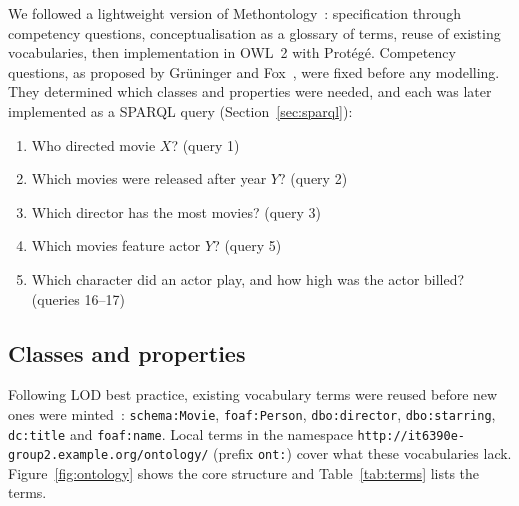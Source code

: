 \documentclass[11pt,a4paper]{article}
\newcommand{\code}[1]{\texttt{#1}}
\begin{document}
We followed a lightweight version of Methontology~\cite{methontology}: specification through competency questions, conceptualisation as a glossary of terms, reuse of existing vocabularies, then implementation in OWL~2 with Protégé. Competency questions, as proposed by Grüninger and Fox~\cite{gruninger1995}, were fixed before any modelling. They determined which classes and properties were needed, and each was later implemented as a SPARQL query (Section~\ref{sec:sparql}):
\begin{enumerate}
  \item Who directed movie $X$? \hfill (query 1)
  \item Which movies were released after year $Y$? \hfill (query 2)
  \item Which director has the most movies? \hfill (query 3)
  \item Which movies feature actor $Y$? \hfill (query 5)
  \item Which character did an actor play, and how high was the actor billed? \hfill (queries 16--17)
\end{enumerate}

\subsection{Classes and properties}

Following LOD best practice, existing vocabulary terms were reused before new ones were minted~\cite{bizer2009linked}: \code{schema:Movie}, \code{foaf:Person}, \code{dbo:director}, \code{dbo:starring}, \code{dc:title} and \code{foaf:name}. Local terms in the namespace \code{http://it6390e-group2.example.org/ontology/} (prefix \code{ont:}) cover what these vocabularies lack. Figure~\ref{fig:ontology} shows the core structure and Table~\ref{tab:terms} lists the terms.
\end{document}

